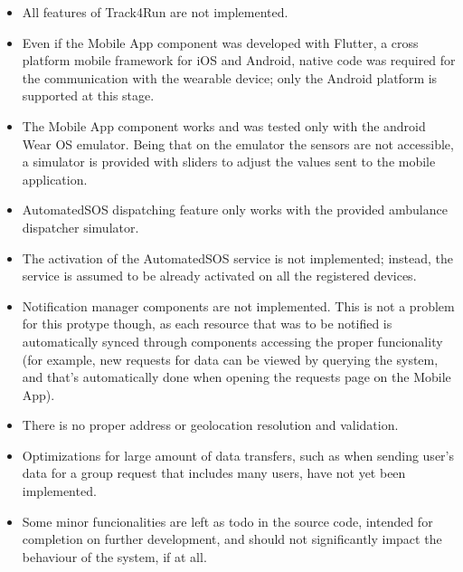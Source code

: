 \documentclass[../main.tex]{subfiles}
\begin{document}
\begin{itemize}
	\item All features of Track4Run are not implemented.
	\item Even if the Mobile App component was developed with Flutter, a cross platform mobile framework for iOS and Android, native code was required for the communication with the wearable device; only the Android platform is supported at this stage.
	\item The Mobile App component works and was tested only with the android Wear OS emulator. Being that on the emulator the sensors are not accessible, a simulator is provided with sliders to adjust the values sent to the mobile application.
	\item AutomatedSOS dispatching feature only works with the provided ambulance dispatcher simulator.
	\item The activation of the AutomatedSOS service is not implemented; instead, the service is assumed to be already activated on all the registered devices.
	\item Notification manager components are not implemented. This is not a problem for this protype though, as each resource that was to be notified is automatically synced through components accessing the proper funcionality (for example, new requests for data can be viewed by querying the system, and that's automatically done when opening the requests page on the Mobile App).
	\item There is no proper address or geolocation resolution and validation.
	\item Optimizations for large amount of data transfers, such as when sending user's data for a group request that includes many users, have not yet been implemented.
	\item Some minor funcionalities are left as todo in the source code, intended for completion on further development, and should not significantly impact the behaviour of the system, if at all.
\end{itemize}
\end{document}
